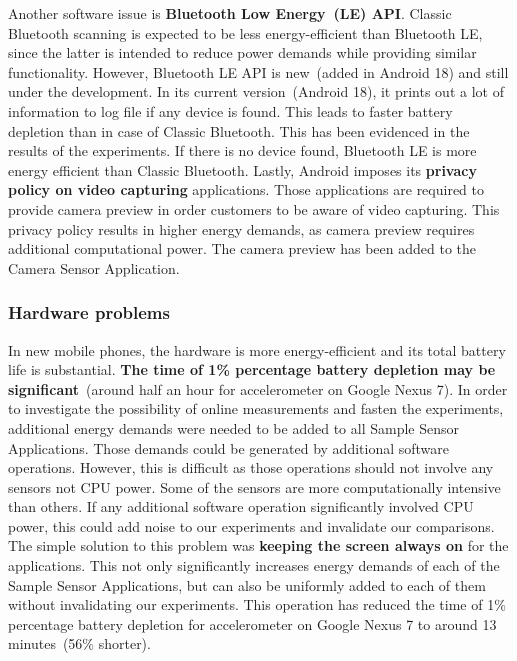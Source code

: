 
Another software issue is \textbf{Bluetooth Low Energy\ (LE) API}. Classic Bluetooth scanning is expected to be less energy-efficient than Bluetooth LE, since the latter is intended to reduce power demands while providing similar functionality. However, Bluetooth LE API is new\ (added in Android 18) and still under the development. In its current version\ (Android 18),  it prints out a lot of information to log file if any device is found. This leads to faster battery depletion than in case of Classic Bluetooth. This has been evidenced in the results of the experiments. If there is no device found, Bluetooth LE is more energy efficient than Classic Bluetooth. Lastly, Android imposes its \textbf{privacy policy on video capturing} applications. Those applications are required to provide camera preview in order customers to be aware of video capturing. This privacy policy results in higher energy demands, as camera preview requires additional computational power. The camera preview has been added to the Camera Sensor Application.
		
\subsubsection{Hardware problems}
\hspace{10pt} In new mobile phones, the hardware is more energy-efficient and its total battery life is substantial. \textbf{The time of 1\% percentage battery depletion may be significant}\ (around half an hour for accelerometer on Google Nexus 7). In order to investigate the possibility of online measurements and fasten the experiments, additional energy demands were needed to be added to all Sample Sensor Applications. Those demands could be generated by additional software operations. However, this is difficult as those operations should not involve any sensors not CPU power. Some of the sensors are more computationally intensive than others. If any additional software operation significantly involved CPU power, this could add noise to our experiments and invalidate our comparisons. The simple solution to this problem was \textbf{keeping the screen always on} for the applications.  This not only significantly increases energy demands of each of the Sample Sensor Applications, but can also be uniformly added to each of them without invalidating our experiments.  This operation has reduced the time of 1\% percentage battery depletion for accelerometer on Google Nexus 7 to around 13 minutes\ (56\% shorter).  

